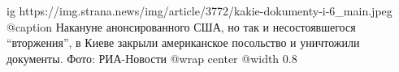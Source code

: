  
 
 
 
 

\ifcmt
  ig https://img.strana.news/img/article/3772/kakie-dokumenty-i-6_main.jpeg
  @caption Накануне анонсированного США, но так и несостоявшегося \enquote{вторжения}, в Киеве закрыли американское посольство и уничтожили документы. Фото: РИА-Новости 
  @wrap center
  @width 0.8
\fi
